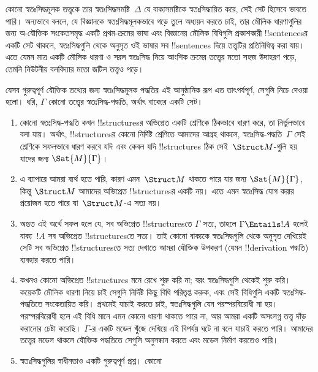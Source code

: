 \documentclass[../../../include/open-logic-section]{subfiles}
\begin{document}
\begin{explain}
কোনো স্বতঃসিদ্ধমূলক তত্ত্বকে তার স্বতঃসিদ্ধসমষ্টি~$\Delta$ যে
বাক্যসমষ্টিকে স্বতঃসিদ্ধায়িত করে, সেই সেট হিসেবে ভাবতে পারি।
অন্যভাবে বললে, যে বিজ্ঞানকে স্বতঃসিদ্ধমূলকভাবে গড়ে তুলে অধ্যয়ন করতে
চাই, তার মৌলিক ধারণাগুলির জন্য অ-যৌক্তিক সংকেতসমৃদ্ধ একটি প্রথম-ক্রমের
ভাষা এবং বিজ্ঞানের মৌলিক বিধিগুলি প্রকাশকারী !!{sentence}sর একটি সেট
থাকলে, স্বতঃসিদ্ধগুলি থেকে অনুসৃত ওই ভাষার সব !!{sentence}s দিয়ে
তত্ত্বটির প্রতিনিধিত্ব করা যায়। এতে যেমন মাত্র একটি মৌলিক ধারণা ও
সরল স্বতঃসিদ্ধ নিয়ে আংশিক ক্রমের তত্ত্বের মতো সহজ উদাহরণ পড়ে, তেমনি
নিউটনীয় বলবিদ্যার মতো জটিল তত্ত্বও পড়ে।

যেসব গুরুত্বপূর্ণ যৌক্তিক তথ্যের জন্য স্বতঃসিদ্ধমূলক পদ্ধতির এই
আনুষ্ঠানিক রূপ এত তাৎপর্যপূর্ণ, সেগুলি নিচে দেওয়া হলো। ধরি,
$\Gamma$ কোনো তত্ত্বের স্বতঃসিদ্ধ-পদ্ধতি, অর্থাৎ বাক্যের
একটি সেট।
\begin{enumerate}
\item কোনো স্বতঃসিদ্ধ-পদ্ধতি কখন !!{structure}sর অভিপ্রেত একটি
  শ্রেণিকে ঠিকভাবে ধারণ করে, তা নির্ভুলভাবে বলা যায়। অর্থাৎ,
  !!{structure}sর কোনো নির্দিষ্ট শ্রেণিতে আমাদের আগ্রহ থাকলে,
  স্বতঃসিদ্ধ-পদ্ধতি~$\Gamma$ সেই শ্রেণিকে সফলভাবে ধারণ করবে যদি এবং
  কেবল যদি !!{structure}s ঠিক সেই~$\Struct M$-গুলি হয় যাদের জন্য
  $\Sat{M}{\Gamma}$।
\item এ ব্যাপারে আমরা ব্যর্থ হতে পারি, কারণ এমন~$\Struct M$ থাকতে পারে
  যার জন্য $\Sat{M}{\Gamma}$, কিন্তু $\Struct M$ আমাদের অভিপ্রেত
  !!{structure}sর একটি নয়। এতে এমন স্বতঃসিদ্ধ যোগ করার প্রয়োজন হতে
  পারে যা~$\Struct M$-এ সত্য নয়।
\item অন্তত এই অর্থে সফল হলে যে, সব অভিপ্রেত !!{structure}sতে
  $\Gamma$ সত্য, তাহলে $\Gamma \Entails !A$ হলেই বাক্য~$!A$ সব অভিপ্রেত
  !!{structure}sতে সত্য। তাই কোনো বাক্যকে স্বতঃসিদ্ধগুলি থেকে অনুসৃত
  দেখিয়েই সেটি সব অভিপ্রেত !!{structure}sতে সত্য দেখাতে আমরা যৌক্তিক
  উপকরণ (যেমন !!{derivation} পদ্ধতি) ব্যবহার করতে পারি।
\item কখনও কোনো অভিপ্রেত !!{structure}s মনে রেখে শুরু করি না; বরং
  স্বতঃসিদ্ধগুলি থেকেই শুরু করি। কয়েকটি মৌলিক ধারণা নিয়ে চাই সেগুলি
  নির্দিষ্ট কিছু বিধি পরিতৃপ্ত করুক, এবং সেই বিধিগুলি একটি
  স্বতঃসিদ্ধ-পদ্ধতিতে সংকেতায়িত করি। প্রথমেই যাচাই করতে চাই,
  স্বতঃসিদ্ধগুলি যেন পরস্পরবিরোধী না হয়। পরস্পরবিরোধী হলে এই বিধি
  মানে এমন কোনো ধারণা থাকতে পারে না, আর আমরা একটি অসংলগ্ন তত্ত্ব
  দাঁড় করানোর চেষ্টা করেছি। $\Gamma$-র একটি মডেল খুঁজে দেখিয়ে এই
  বিপর্যয় ঘটে না বলে যাচাই করতে পারি। আমাদের তত্ত্বের মডেল থাকলে
  যৌক্তিক পদ্ধতিতে সেগুলি অনুসন্ধান করতে এবং মডেল নির্মাণ করতেও পারি।
\item স্বতঃসিদ্ধগুলির স্বাধীনতাও একটি গুরুত্বপূর্ণ প্রশ্ন। কোনো

\end{enumerate}
\end{explain}
\end{document}

